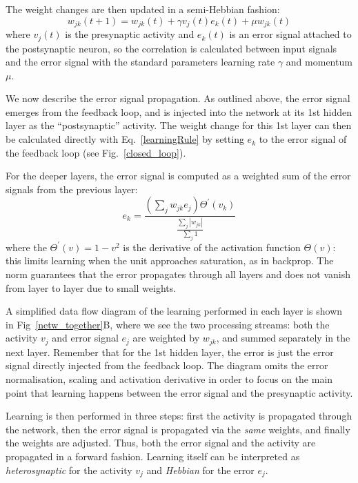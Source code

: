 \documentclass{article}
\begin{document}
The weight changes are then updated in a semi-Hebbian fashion:
\begin{equation}
  w_{jk}(t+1) = w_{jk}(t) + \gamma v_j(t)  e_k(t) + \mu w_{jk}(t) \label{learningRule}
\end{equation}
where $v_j(t)$ is the presynaptic activity and $e_k(t)$ is an error
signal attached to the postsynaptic neuron, so the correlation is
calculated between input signals and the error signal with the
standard parameters learning rate $\gamma$ and momentum $\mu$.

We now describe the error signal propagation. As outlined above, the
error signal emerges from the feedback loop, and is injected into the
network at its 1st hidden layer as the ``postsynaptic'' activity. The
weight change for this 1st layer can then be calculated directly with
Eq.~\ref{learningRule} by setting $e_k$ to the error signal of the
feedback loop (see Fig.~\ref{closed_loop}).

For the deeper layers, the error signal is computed as a weighted
sum of the error signals from the previous layer:
\begin{equation}
  e_k = \frac{\left( \sum_j w_{jk} e_{j} \right) \Theta^\prime (v_k) }{\frac{\sum_j {|w_{jk}|}}{\sum_j 1}}
  \label{deepError}
\end{equation}
where the $\Theta^\prime (v) = 1 - v^2$ is the derivative of the
activation function $\Theta(v)$: this limits learning when the unit
approaches saturation, as in backprop. The norm guarantees that
the error propagates through all layers and does not vanish from
layer to layer due to small weights.

A simplified data flow diagram of the learning performed in each layer
is shown in Fig~\ref{netw_together}B, where we see the two processing
streams: both the activity $v_j$ and error signal $e_j$ are weighted
by $w_{jk}$, and summed separately in the next layer. Remember that
for the 1st hidden layer, the error is just the error signal
directly injected from the feedback loop. The diagram omits the error
normalisation, scaling and activation derivative in order to focus on
the main point that learning happens between the error signal and the
presynaptic activity.

Learning is then performed in three steps: first the activity is
propagated through the network, then the error signal is propagated
via the \textsl{same} weights, and finally the weights are adjusted. Thus,
both the error signal and the activity are propagated in a forward
fashion. Learning itself can be interpreted as \textsl{heterosynaptic} for the
activity $v_j$ and \textsl{Hebbian} for the error $e_j$.
\end{document}
